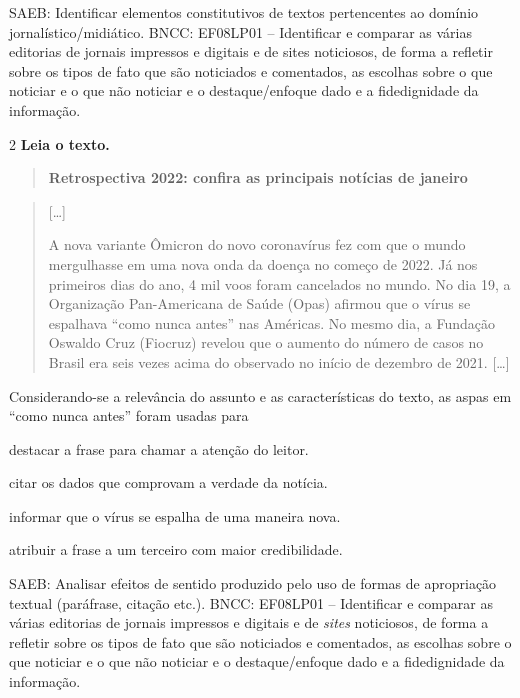 SAEB: Identificar elementos constitutivos de textos pertencentes ao
domínio jornalístico/midiático. BNCC: EF08LP01 -- Identificar e comparar
as várias editorias de jornais impressos e digitais e de sites
noticiosos, de forma a refletir sobre os tipos de fato que são
noticiados e comentados, as escolhas sobre o que noticiar e o que não
noticiar e o destaque/enfoque dado e a fidedignidade da informação.

\num{2} \textbf{Leia o texto.}

\begin{quote}
\textbf{Retrospectiva 2022: confira as principais notícias de janeiro}
\end{quote}

\begin{quote}
{[}\ldots{]}

A nova variante Ômicron do novo coronavírus fez com que o mundo
mergulhasse em uma nova onda da doença no começo de 2022. Já nos
primeiros dias do ano, 4 mil voos foram cancelados no mundo. No dia 19,
a Organização Pan-Americana de Saúde (Opas) afirmou que o vírus se
espalhava ``como nunca antes'' nas Américas. No mesmo dia, a Fundação
Oswaldo Cruz (Fiocruz) revelou que o aumento do número de casos no
Brasil era seis vezes acima do observado no início de dezembro de 2021.
{[}\ldots{]}
\end{quote}


Considerando-se a relevância do assunto e as características do texto,
as aspas em ``como nunca antes'' foram usadas para

\begin{escolha}

\item destacar a frase para chamar a atenção do leitor. 
\item citar os dados que comprovam a verdade da notícia.
\item informar que o vírus se espalha de uma maneira nova.
\item atribuir a frase a um terceiro com maior credibilidade.
\end{escolha}

SAEB: Analisar efeitos de sentido produzido pelo uso de formas de
apropriação textual (paráfrase, citação etc.). BNCC: EF08LP01 --
Identificar e comparar as várias editorias de jornais impressos e
digitais e de \emph{sites} noticiosos, de forma a refletir sobre os
tipos de fato que são noticiados e comentados, as escolhas sobre o que
noticiar e o que não noticiar e o destaque/enfoque dado e a
fidedignidade da informação.

